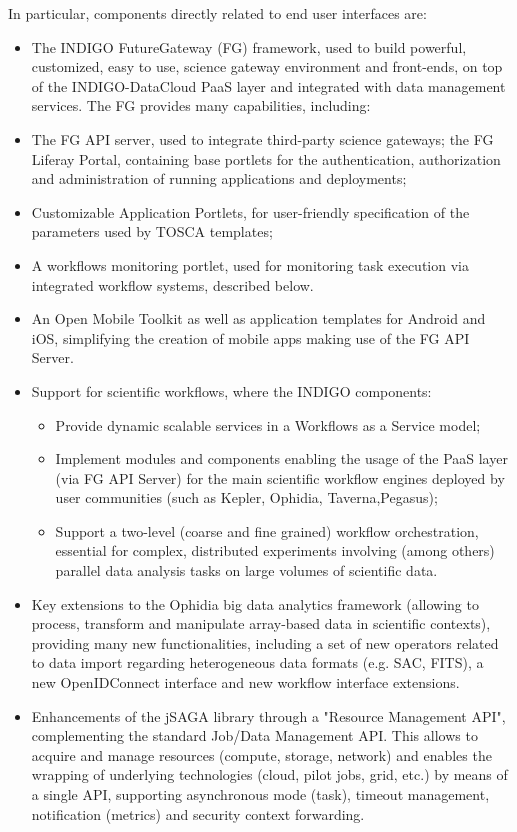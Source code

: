 \documentclass{article}
\begin{document}
In particular, components directly related to end user interfaces are: 

\begin{itemize}
\item The INDIGO FutureGateway (FG) framework, used to build powerful, customized, easy to use, science gateway environment and front-ends, on top of the INDIGO-DataCloud PaaS layer and integrated with data management services. The FG provides many capabilities, including: 
\item The FG API server, used to integrate third-party science gateways; the FG Liferay Portal, containing base portlets for the authentication, authorization and administration of running applications and deployments; 
\item Customizable Application Portlets, for user-friendly specification of the parameters used by TOSCA templates;  
\item A workflows monitoring portlet, used for monitoring task execution via integrated workflow systems, described below. 
\item An Open Mobile Toolkit as well as application templates for Android and iOS, simplifying the creation of mobile apps making use of the FG API Server. 
\item Support for scientific workflows, where the INDIGO components: 
\begin{itemize}
\item Provide dynamic scalable services in a Workflows as a Service model;
\item Implement modules and components enabling the usage of the PaaS layer (via FG API Server) for the main scientific workflow engines deployed by user communities (such as Kepler, Ophidia, Taverna,Pegasus);  
\item Support a two-level (coarse and fine grained) workflow orchestration, essential for complex, distributed experiments involving (among others) parallel data analysis tasks on large volumes of scientific data.    
\end{itemize}
\item Key extensions to the Ophidia big data analytics framework (allowing to process, transform and manipulate array-based data in scientific contexts), providing many new functionalities, including a set of new operators related to data import regarding heterogeneous data formats (e.g. SAC, FITS), a new OpenIDConnect interface and new workflow interface extensions. 

\item Enhancements of the jSAGA library through a "Resource Management API", complementing the standard Job/Data Management API. This allows to acquire and manage resources (compute, storage, network) and enables the wrapping of underlying technologies (cloud, pilot jobs, grid, etc.) by means of a single API, supporting asynchronous mode (task), timeout management, notification (metrics) and security context forwarding. 


\end{itemize}
\end{document}
